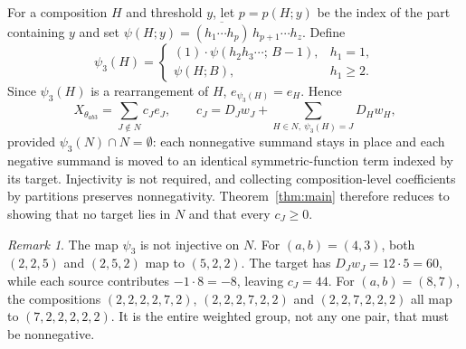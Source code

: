 \documentclass[11pt]{article}
\theoremstyle{remark}
\newtheorem{remark}{Remark}
\theoremstyle{definition}
\newcommand{\rev}{\overline}
\begin{document}
For a composition $H$ and threshold $y$, let $p=p(H;y)$ be the index of the part containing $y$ and set $\psi(H;y)=\rev{(h_1\cdots h_p)}\,h_{p+1}\cdots h_z$. Define
\[
\psi_3(H)=\begin{cases}(1)\cdot\psi(h_2h_3\cdots;\,B-1),& h_1=1,\\ \psi(H;B),&h_1\ge2.\end{cases}
\]
Since $\psi_3(H)$ is a rearrangement of $H$, $e_{\psi_3(H)}=e_H$. Hence
\begin{equation}\label{eq:regroup}
X_{\theta_{ab3}}=\sum_{J\notin N}c_Je_J,\qquad c_J=D_Jw_J+\sum_{H\in N,\ \psi_3(H)=J}D_Hw_H,
\end{equation}
provided $\psi_3(N)\cap N=\emptyset$: each nonnegative summand stays in place and each negative summand is moved to an identical symmetric-function term indexed by its target. Injectivity is not required, and collecting composition-level coefficients by partitions preserves nonnegativity. Theorem~\ref{thm:main} therefore reduces to showing that no target lies in $N$ and that every $c_J\ge0$.

\begin{remark}\label{rem:noninj}
The map $\psi_3$ is not injective on $N$. For $(a,b)=(4,3)$, both $(2,2,5)$ and $(2,5,2)$ map to $(5,2,2)$. The target has $D_Jw_J=12\cdot5=60$, while each source contributes $-1\cdot8=-8$, leaving $c_J=44$. For $(a,b)=(8,7)$, the compositions $(2,2,2,2,7,2)$, $(2,2,2,7,2,2)$ and $(2,2,7,2,2,2)$ all map to $(7,2,2,2,2,2)$. It is the entire weighted group, not any one pair, that must be nonnegative.
\end{remark}
\end{document}
